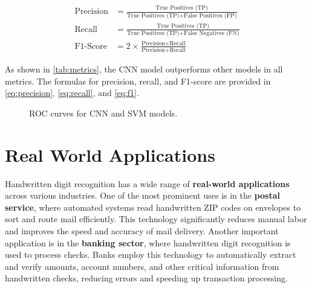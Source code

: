 \documentclass[conference]{IEEEtran}
\begin{document}
\begin{align}
    \text{Precision} &= \frac{\text{True Positives (TP)}}{\text{True Positives (TP)} + \text{False Positives (FP)}} \label{eq:precision} \\
    \text{Recall} &= \frac{\text{True Positives (TP)}}{\text{True Positives (TP)} + \text{False Negatives (FN)}} \label{eq:recall} \\
    \text{F1-Score} &= 2 \times \frac{\text{Precision} \times \text{Recall}}{\text{Precision} + \text{Recall}} \label{eq:f1}
\end{align}

As shown in \cref{tab:metrics}, the CNN model outperforms other models in all metrics. The formulas for precision, recall, and F1-score are provided in \cref{eq:precision}, \cref{eq:recall}, and \cref{eq:f1}.

\begin{figure}[h]
\centering
{}
\caption{ROC curves for CNN and SVM models.}
\label{fig:roc}
\end{figure}

\section{Real World Applications}
Handwritten digit recognition has a wide range of \textbf{real-world applications} across various industries. One of the most prominent uses is in the \textbf{postal service}, where automated systems read handwritten ZIP codes on envelopes to sort and route mail efficiently. This technology significantly reduces manual labor and improves the speed and accuracy of mail delivery. Another important application is in the \textbf{banking sector}, where handwritten digit recognition is used to process checks. Banks employ this technology to automatically extract and verify amounts, account numbers, and other critical information from handwritten checks, reducing errors and speeding up transaction processing.
\end{document}
